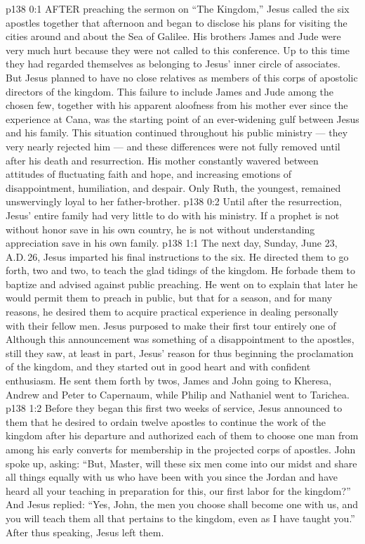 \vs p138 0:1 AFTER preaching the sermon on “The Kingdom,” Jesus called the six apostles together that afternoon and began to disclose his plans for visiting the cities around and about the Sea of Galilee. His brothers James and Jude were very much hurt because they were not called to this conference. Up to this time they had regarded themselves as belonging to Jesus’ inner circle of associates. But Jesus planned to have no close relatives as members of this corps of apostolic directors of the kingdom. This failure to include James and Jude among the chosen few, together with his apparent aloofness from his mother ever since the experience at Cana, was the starting point of an ever\hyp{}widening gulf between Jesus and his family. This situation continued throughout his public ministry --- they very nearly rejected him --- and these differences were not fully removed until after his death and resurrection. His mother constantly wavered between attitudes of fluctuating faith and hope, and increasing emotions of disappointment, humiliation, and despair. Only Ruth, the youngest, remained unswervingly loyal to her father\hyp{}brother.
\vs p138 0:2 Until after the resurrection, Jesus’ entire family had very little to do with his ministry. If a prophet is not without honor save in his own country, he is not without understanding appreciation save in his own family.
\vs p138 1:1 The next day, Sunday, June 23, A.D.\,26, Jesus imparted his final instructions to the six. He directed them to go forth, two and two, to teach the glad tidings of the kingdom. He forbade them to baptize and advised against public preaching. He went on to explain that later he would permit them to preach in public, but that for a season, and for many reasons, he desired them to acquire practical experience in dealing personally with their fellow men. Jesus purposed to make their first tour entirely one of  Although this announcement was something of a disappointment to the apostles, still they saw, at least in part, Jesus’ reason for thus beginning the proclamation of the kingdom, and they started out in good heart and with confident enthusiasm. He sent them forth by twos, James and John going to Kheresa, Andrew and Peter to Capernaum, while Philip and Nathaniel went to Tarichea.
\vs p138 1:2 Before they began this first two weeks of service, Jesus announced to them that he desired to ordain twelve apostles to continue the work of the kingdom after his departure and authorized each of them to choose one man from among his early converts for membership in the projected corps of apostles. John spoke up, asking: “But, Master, will these six men come into our midst and share all things equally with us who have been with you since the Jordan and have heard all your teaching in preparation for this, our first labor for the kingdom?” And Jesus replied: \textcolor{ubdarkred}{“Yes, John, the men you choose shall become one with us, and you will teach them all that pertains to the kingdom, even as I have taught you.”} After thus speaking, Jesus left them.

